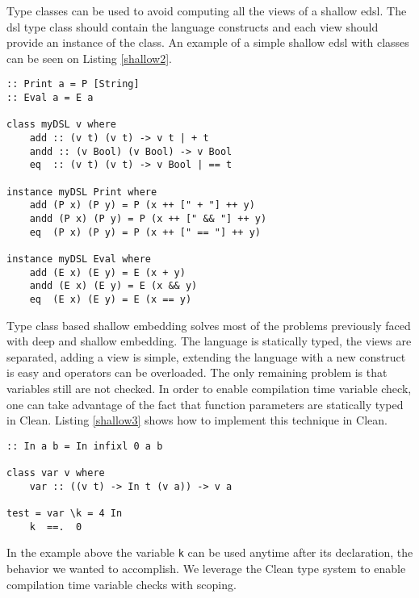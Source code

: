 Type classes can be used to avoid computing all the views of a shallow \ac{edsl}. The \ac{dsl} type class should contain the language constructs and each view should provide an instance of the class. An example of a simple shallow \ac{edsl} with classes can be seen on Listing \ref{shallow2}.

\begin{lstlisting}[caption=A simple shallow \ac{edsl} with classes,captionpos=b,label=shallow2]
:: Print a = P [String]
:: Eval a = E a

class myDSL v where
    add :: (v t) (v t) -> v t | + t
    andd :: (v Bool) (v Bool) -> v Bool
    eq  :: (v t) (v t) -> v Bool | == t
    
instance myDSL Print where
    add (P x) (P y) = P (x ++ [" + "] ++ y)
    andd (P x) (P y) = P (x ++ [" && "] ++ y)
    eq  (P x) (P y) = P (x ++ [" == "] ++ y)
    
instance myDSL Eval where
    add (E x) (E y) = E (x + y)
    andd (E x) (E y) = E (x && y)
    eq  (E x) (E y) = E (x == y)
\end{lstlisting}

Type class based shallow embedding solves most of the problems previously faced with deep and shallow embedding. The language is statically typed, the views are separated, adding a view is simple, extending the language with a new construct is easy and operators can be overloaded. The only remaining problem is that variables still are not checked. In order to enable compilation time variable check, one can take advantage of the fact that function parameters are statically typed in Clean. Listing \ref{shallow3} shows how to implement this technique in Clean.

\begin{lstlisting}[caption=A simple shallow \ac{edsl} with classes,captionpos=b,label=shallow3]
:: In a b = In infixl 0 a b

class var v where
	var :: ((v t) -> In t (v a)) -> v a
	
test = var \k = 4 In
	k  ==.  0
\end{lstlisting}

In the example above the variable \texttt{k} can be used anytime after its declaration, the behavior we wanted to accomplish. We leverage the Clean type system to enable compilation time variable checks with scoping.